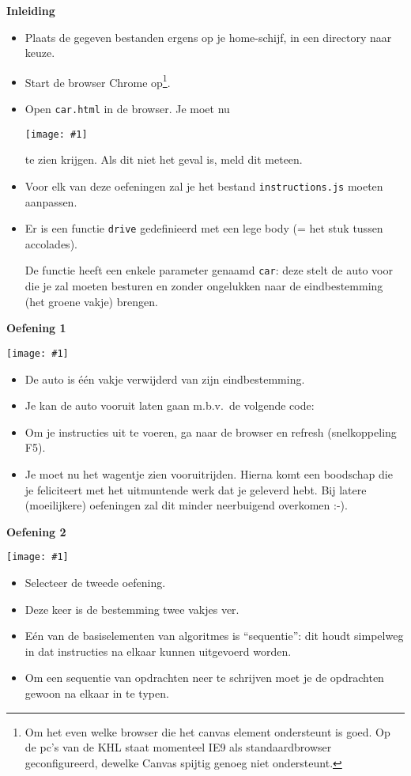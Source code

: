 \documentclass[a4paper]{article}
\newcommand{\newexercise}[1]{\clearpage\begin{center}\Huge\bf #1\end{center}}
\newcommand{\exercisemap}[1]{\begin{center}\texttt{[image: \#1]}\end{center}}
\newcommand{\code}[1]{
  \begin{center}
    \begin{minipage}{.8\linewidth}
      
    \end{minipage}
  \end{center}
}
\begin{document}
\newexercise{Inleiding}
\begin{itemize}
  \item Plaats de gegeven bestanden ergens op je home-schijf, in een directory naar keuze.
  \item Start de browser Chrome op\footnote{Om het even welke browser
        die het canvas element ondersteunt is goed. Op de pc's van de KHL
        staat momenteel IE9 als standaardbrowser geconfigureerd, dewelke
        Canvas spijtig genoeg niet ondersteunt.}.
  \item Open \verb'car.html' in de browser. Je moet nu
        \exercisemap{ex1} te zien krijgen. Als dit niet het geval is,
        meld dit meteen.
  \item Voor elk van deze oefeningen zal je het bestand \verb'instructions.js' moeten aanpassen.
  \item Er is een functie \verb'drive' gedefinieerd met een lege body (= het stuk tussen accolades).
        \code{drive.js}
        De functie heeft een enkele parameter genaamd \verb'car': deze
        stelt de auto voor die je zal moeten besturen en zonder ongelukken
        naar de eindbestemming (het groene vakje) brengen.
\end{itemize}


\newexercise{Oefening 1}
\exercisemap{ex1}

\begin{itemize}
  \item De auto is \'e\'en vakje verwijderd van zijn eindbestemming.
  \item Je kan de auto vooruit laten gaan m.b.v.\ de volgende code:
        \code{forward.js}
  \item Om je instructies uit te voeren, ga naar de browser en refresh (snelkoppeling F5).
  \item Je moet nu het wagentje zien vooruitrijden. Hierna komt
        een boodschap die je feliciteert met het uitmuntende werk dat je geleverd
        hebt. Bij latere (moeilijkere) oefeningen zal dit minder neerbuigend overkomen :-).
\end{itemize}


\newexercise{Oefening 2}
\exercisemap{ex2}

\begin{itemize}
  \item Selecteer de tweede oefening.
  \item Deze keer is de bestemming twee vakjes ver.
  \item E\'en van de basiselementen van algoritmes is ``sequentie'':
        dit houdt simpelweg in dat instructies na elkaar
        kunnen uitgevoerd worden.
  \item Om een sequentie van opdrachten neer te schrijven
        moet je de opdrachten gewoon na elkaar in te typen.
\end{itemize}
\end{document}
